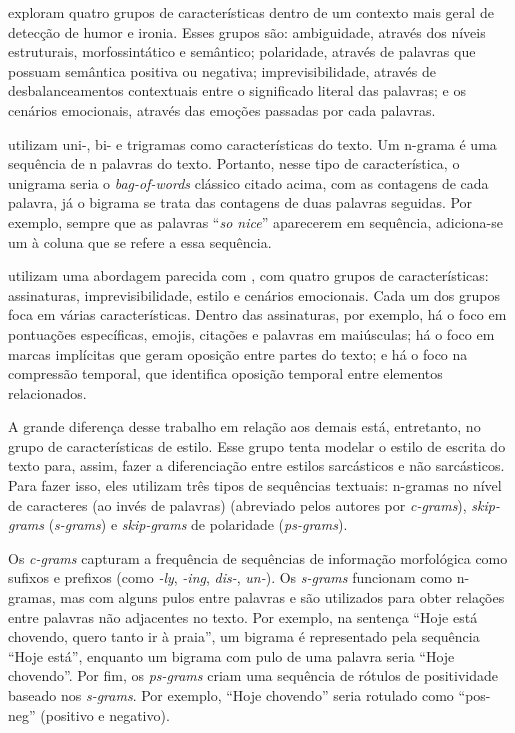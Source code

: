 \cite{reyes:2012:from-humor} exploram quatro grupos de características dentro de
um contexto mais geral de detecção de humor e ironia. Esses grupos são:
ambiguidade, através dos níveis estruturais, morfossintático e semântico;
polaridade, através de palavras que possuam semântica positiva ou negativa;
imprevisibilidade, através de desbalanceamentos contextuais entre o significado
literal das palavras; e os cenários emocionais, através das emoções passadas por
cada palavras.

\cite{liebrecht:2013:perfect-solution} utilizam uni-, bi- e trigramas como
características do texto. Um n-grama é uma sequência de n palavras do texto.
Portanto, nesse tipo de característica, o unigrama seria o \textit{bag-of-words}
clássico citado acima, com as contagens de cada palavra, já o bigrama se trata
das contagens de duas palavras seguidas. Por exemplo, sempre que as palavras
``\textit{so nice}'' aparecerem em sequência, adiciona-se um à coluna que se
refere a essa sequência.

\cite{reyes:2013:multidimensional-approach} utilizam uma abordagem parecida com
\cite{reyes:2012:from-humor}, com quatro grupos de características: assinaturas,
imprevisibilidade, estilo e cenários emocionais. Cada um dos grupos foca em
várias características. Dentro das assinaturas, por exemplo, há o foco em
pontuações específicas, emojis, citações e palavras em maiúsculas; há o foco em
marcas implícitas que geram oposição entre partes do texto; e há o foco na
compressão temporal, que identifica oposição temporal entre elementos
relacionados.

A grande diferença desse trabalho em relação aos demais está, entretanto, no
grupo de características de estilo. Esse grupo tenta modelar o estilo de escrita
do texto para, assim, fazer a diferenciação entre estilos sarcásticos e não
sarcásticos. Para fazer isso, eles utilizam três tipos de sequências textuais:
n-gramas no nível de caracteres (ao invés de palavras) (abreviado pelos autores
por \textit{c-grams}), \textit{skip-grams} (\textit{s-grams}) e
\textit{skip-grams} de polaridade (\textit{ps-grams}).

Os \textit{c-grams} capturam a frequência de sequências de informação
morfológica como sufixos e prefixos (como \textit{-ly}, \textit{-ing},
\textit{dis-}, \textit{un-}). Os \textit{s-grams} funcionam como n-gramas, mas
com alguns pulos entre palavras e são utilizados para obter relações entre
palavras não adjacentes no texto. Por exemplo, na sentença ``Hoje está chovendo,
quero tanto ir à praia'', um bigrama é representado pela sequência ``Hoje
está'', enquanto um bigrama com pulo de uma palavra seria ``Hoje chovendo''. Por
fim, os \textit{ps-grams} criam uma sequência de rótulos de positividade baseado
nos \textit{s-grams}. Por exemplo, ``Hoje chovendo'' seria rotulado como
``pos-neg'' (positivo e negativo).

